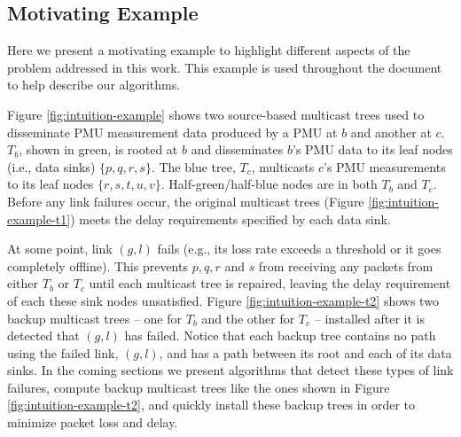 

\subsection{Motivating Example}
\label{subsec:problem-scenario}

Here we present a motivating example to highlight different aspects of the problem addressed in this work.  This example is used throughout the document to help describe our algorithms.

Figure \ref{fig:intuition-example} shows two source-based multicast trees used to disseminate PMU measurement data produced by a PMU at $b$ and another at $c$. $T_b$, shown in green, 
is rooted at $b$ and disseminates $b$'s PMU data to its leaf nodes (i.e., data sinks) $\{p,q,r,s\}$. The blue tree, $T_c$, multicasts $c$'s PMU measurements to its
leaf nodes $\{r,s,t,u,v\}$.  %
Half-green/half-blue nodes are in both $T_b$ and $T_c$.   Before any link failures occur, the original multicast trees (Figure \ref{fig:intuition-example-t1}) meets the delay requirements
specified by each data sink.  

At some point, link $(g,l)$ fails (e.g., its loss rate exceeds a threshold or it goes completely offline).
This prevents $p,q,r$ and $s$ from receiving any packets from either $T_b$ or $T_c$ until each multicast tree is repaired, leaving the delay requirement of each these sink nodes unsatisfied. 
Figure \ref{fig:intuition-example-t2} shows two backup multicast trees -- one for $T_b$ and the other for $T_c$ --
installed after it is detected that $(g,l)$ has failed.
Notice that each backup tree contains no path using the failed link, $(g,l)$, and has a path between its root and each of its data sinks.
In the coming sections we present algorithms that detect these types of link failures, compute backup multicast trees like the ones shown in Figure \ref{fig:intuition-example-t2}, 
and quickly install these backup trees in order to minimize packet loss and delay.


